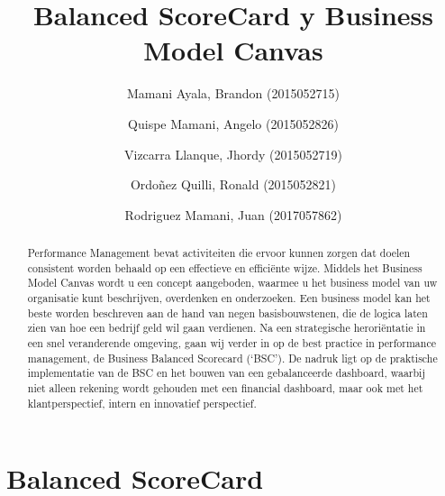 \documentclass[preprint,12pt]{elsarticle}
\begin{document}
	
	\begin{frontmatter}
		
		
		\title{\huge Balanced ScoreCard y Business Model Canvas}
		
		\author{Mamani Ayala, Brandon        (2015052715)}
		\author{Quispe Mamani, Angelo	      (2015052826)}
		\author{Vizcarra Llanque, Jhordy	      (2015052719)}
		\author{Ordoñez Quilli, Ronald          (2015052821)}
		\author{Rodriguez Mamani, Juan      (2017057862)}
		
		\address{Tacna, Perú}
		
		\begin{abstract}
			Performance Management bevat activiteiten die ervoor kunnen zorgen dat doelen consistent worden behaald op een effectieve en efficiënte wijze. Middels het Business Model Canvas wordt u een concept aangeboden, waarmee u het business model van uw organisatie kunt beschrijven, overdenken en onderzoeken. Een business model kan het beste worden beschreven aan de hand van negen basisbouwstenen, die de logica laten zien van hoe een bedrijf geld wil gaan verdienen.
Na een strategische heroriëntatie in een snel veranderende omgeving, gaan wij verder in op de best practice in performance management, de Business Balanced Scorecard (‘BSC’). De nadruk ligt op de praktische implementatie van de BSC en het bouwen van een gebalanceerde dashboard, waarbij niet alleen rekening wordt gehouden met een financial dashboard, maar ook met het klantperspectief, intern en innovatief perspectief.
	
		\end{abstract}
\end{frontmatter}

	
	
	
	



\section{Balanced ScoreCard }
\end{document}
